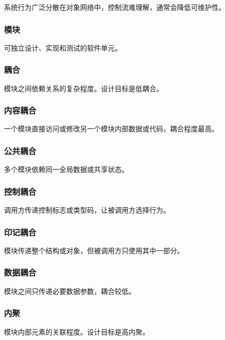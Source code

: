 \documentclass[UTF8,zihao=-4]{ctexart}
\begin{document}
系统行为广泛分散在对象网络中，控制流难理解，通常会降低可维护性。


\subsubsection*{模块}


可独立设计、实现和测试的软件单元。


\subsubsection*{耦合}


模块之间依赖关系的复杂程度。设计目标是低耦合。


\subsubsection*{内容耦合}


一个模块直接访问或修改另一个模块内部数据或代码，耦合程度最高。


\subsubsection*{公共耦合}


多个模块依赖同一全局数据或共享状态。


\subsubsection*{控制耦合}


调用方传递控制标志或类型码，让被调用方选择行为。


\subsubsection*{印记耦合}


模块传递整个结构或对象，但被调用方只使用其中一部分。


\subsubsection*{数据耦合}


模块之间只传递必要数据参数，耦合较低。


\subsubsection*{内聚}


模块内部元素的关联程度。设计目标是高内聚。
\end{document}
